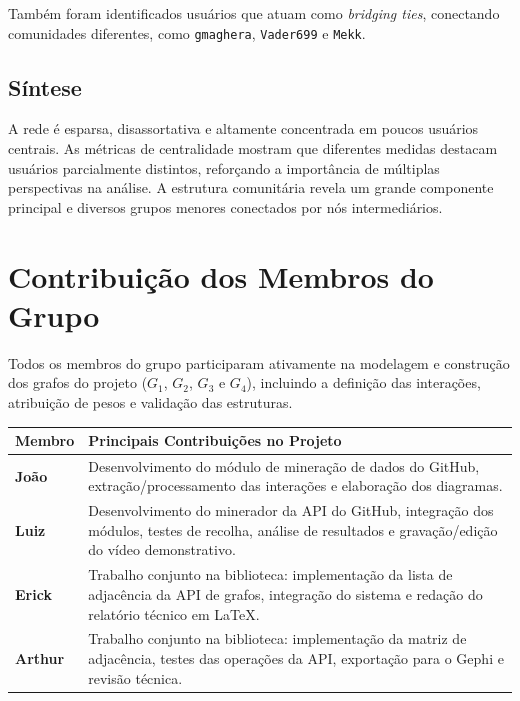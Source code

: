 \documentclass[12pt]{article}
\begin{document}
Também foram identificados usuários que atuam como \textit{bridging ties}, conectando comunidades diferentes, como \texttt{gmaghera}, \texttt{Vader699} e \texttt{Mekk}.

\subsection{Síntese}

A rede é esparsa, disassortativa e altamente concentrada em poucos usuários centrais. As métricas de centralidade mostram que diferentes medidas destacam usuários parcialmente distintos, reforçando a importância de múltiplas perspectivas na análise. A estrutura comunitária revela um grande componente principal e diversos grupos menores conectados por nós intermediários.

\section{Contribuição dos Membros do Grupo}

Todos os membros do grupo participaram ativamente na modelagem e construção dos grafos do projeto ($G_1$, $G_2$, $G_3$ e $G_4$), incluindo a definição das interações, atribuição de pesos e validação das estruturas. 

\begin{table}[htb]
\centering

\label{tab:contribuicoes}
\begin{tabular}{|l|p{9.5cm}|}
\hline
\textbf{Membro} & \textbf{Principais Contribuições no Projeto} \\ \hline
\textbf{João} & Desenvolvimento do módulo de mineração de dados do GitHub, extração/processamento das interações e elaboração dos diagramas. \\ \hline
\textbf{Luiz} & Desenvolvimento do minerador da API do GitHub, integração dos módulos, testes de recolha, análise de resultados e gravação/edição do vídeo demonstrativo. \\ \hline
\textbf{Erick} & Trabalho conjunto na biblioteca: implementação da lista de adjacência da API de grafos, integração do sistema e redação do relatório técnico em \LaTeX{}. \\ \hline
\textbf{Arthur} & Trabalho conjunto na biblioteca: implementação da matriz de adjacência, testes das operações da API, exportação para o Gephi e revisão técnica. \\ \hline
\end{tabular}
\end{table}
\end{document}
